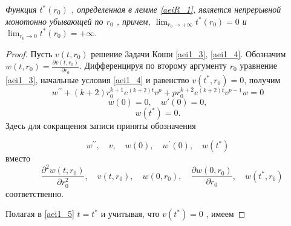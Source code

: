 \begin{lemma}\label{aeiR_2}
\textit{ Функция $ t^*(r_0) $ , определенная в лемме \ref{aeiR_1},
является непрерывной монотонно убывающей по $ r_0 $ , причем, $
\displaystyle \lim_{r_0 \to +\infty}t^{*}(r_0)=0 $  и $
\displaystyle \lim_{r_0 \to 0}t^{*}(r_0)=+\infty.$}
\end{lemma}
\begin{proof}
Пусть $ v(t,r_0) $ решение 3адачи Коши \eqref{aei1_3},
\eqref{aei1_4}. Обозначим $ w(t,r_0)=\frac {\partial v(t, r_0)}{\partial r_0} $.
Дифференцируя по второму аргументу $ r_0 $ уравнение \eqref{aei1_3},
начальные условия \eqref{aei1_4} и равенство $ v(t^*, r_0)=0 $, получим
\begin{equation}\label{aei1_8}
w^{\prime\prime}+(k+2)r_0^{k+1}e^{(k+2)t}v^p+pr_0^{k+2}e^{(k+2)t}v^{p-1}w=0
\end{equation}
\begin{equation}\label{aei1_9}
w(0)=0, \quad w{ \prime}(0)=0,
\end{equation}
\begin{equation}\label{aei1_10}
w(t^*)=0.
\end{equation}
Здесь  для сокращения записи приняты обозначения

$$
w^{\prime\prime},\quad v,\quad w(0),\quad w^{\prime}(0),\quad w(t^*)
$$
 вместо
 $$ \quad \frac {\partial^2w(t,r_0)}{\partial r_0^2},
\quad v(t,r_0),\quad w(0,r_0),\quad \frac {\partial
w(0,r_0)}{\partial r_0},\quad w(t^*,r_0)
$$
соответственно.

Полагая в \eqref{aei1_5} $ t=t^* $  и учитывая, что $ v(t^*)=0 $ , имеем


\end{proof}
